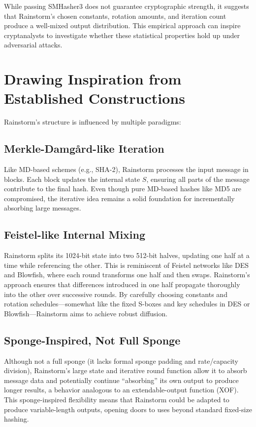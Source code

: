 \documentclass[11pt,a4paper]{article}
\begin{document}
While passing SMHasher3 does not guarantee cryptographic strength, it suggests that Rainstorm’s chosen constants, rotation amounts, and iteration count produce a well-mixed output distribution. This empirical approach can inspire cryptanalysts to investigate whether these statistical properties hold up under adversarial attacks.

\section*{Drawing Inspiration from Established Constructions}
Rainstorm’s structure is influenced by multiple paradigms:

\subsection*{Merkle-Damg{\aa}rd-like Iteration}
Like MD-based schemes (e.g., SHA-2), Rainstorm processes the input message in blocks. Each block updates the internal state \(S\), ensuring all parts of the message contribute to the final hash. Even though pure MD-based hashes like MD5 are compromised, the iterative idea remains a solid foundation for incrementally absorbing large messages.

\subsection*{Feistel-like Internal Mixing}
Rainstorm splits its 1024-bit state into two 512-bit halves, updating one half at a time while referencing the other. This is reminiscent of Feistel networks like DES and Blowfish, where each round transforms one half and then swaps. Rainstorm’s approach ensures that differences introduced in one half propagate thoroughly into the other over successive rounds. By carefully choosing constants and rotation schedules—somewhat like the fixed S-boxes and key schedules in DES or Blowfish—Rainstorm aims to achieve robust diffusion.

\subsection*{Sponge-Inspired, Not Full Sponge}
Although not a full sponge (it lacks formal sponge padding and rate/capacity division), Rainstorm’s large state and iterative round function allow it to absorb message data and potentially continue “absorbing” its own output to produce longer results, a behavior analogous to an extendable-output function (XOF). This sponge-inspired flexibility means that Rainstorm could be adapted to produce variable-length outputs, opening doors to uses beyond standard fixed-size hashing.
\end{document}
